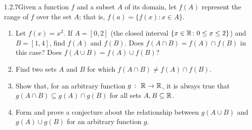 \begin{exercise}
    {1.2.7}Given a function \(f\) and a subset \(A\) of its domain, let \(f(A)\)
represent the range of \(f\) over the set \(A\); that is, \(f(a) = \{f(x) \colon x \in A\}\).
\begin{enumerate}
    \item Let \(f(x) = x^2\). If \(A = [0,2]\) (the closed interval \(\{x \in \mathbb{R} \colon 0 \leq x \leq 2\}\)) and \(B = [1,4]\), find \(f(A)\) and \(f(B)\). Does \(f(A\cap B) = f(A) \cap f(B)\) in this case? Does \(f(A \cup B) = f(A) \cup f(B)\)?
    \item Find two sets \(A\) and \(B\) for which \(f(A\cap B) \ne f(A) \cap f(B)\).
    \item Show that, for an arbitrary function \(g \ \colon \ \mathbb{R} \rightarrow \mathbb{R}\), it is always true that \(g(A \cap B) \subseteq g(A) \cap g(B)\) for all sets \(A,B\subseteq \mathbb{R}\).
    \item Form and prove a conjecture about the relationship between \(g(A \cup B)\) and \(g(A) \cup g(B)\) for an arbitrary function \(g\).
\end{enumerate}
\end{exercise}

